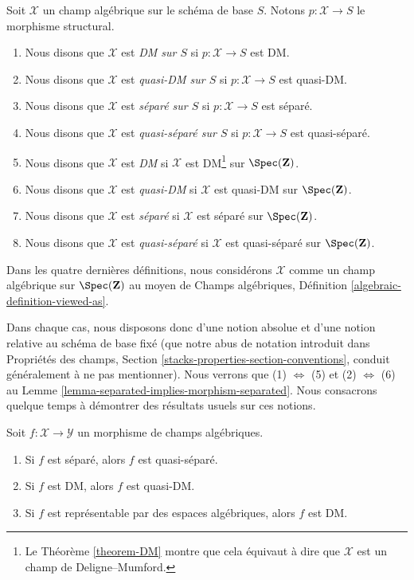 \begin{definition}
\label{definition-absolute-separated}
Soit $\mathcal{X}$ un champ algébrique sur le schéma de base $S$. Notons
$p:\mathcal{X}\to S$ le morphisme structural.
\begin{enumerate}
\item Nous disons que $\mathcal{X}$ est {\it DM sur $S$} si
$p:\mathcal{X}\to S$ est DM.
\item Nous disons que $\mathcal{X}$ est {\it quasi-DM sur $S$} si
$p:\mathcal{X}\to S$ est quasi-DM.
\item Nous disons que $\mathcal{X}$ est {\it séparé sur $S$} si
$p:\mathcal{X}\to S$ est séparé.
\item Nous disons que $\mathcal{X}$ est {\it quasi-séparé sur $S$} si
$p:\mathcal{X}\to S$ est quasi-séparé.
\item Nous disons que $\mathcal{X}$ est {\it DM} si $\mathcal{X}$ est
DM\footnote{Le Théorème \ref{theorem-DM} montre que cela équivaut à dire que
$\mathcal{X}$ est un champ de Deligne--Mumford.} sur $\Spec(\mathbf{Z})$.
\item Nous disons que $\mathcal{X}$ est {\it quasi-DM} si $\mathcal{X}$ est
quasi-DM sur $\Spec(\mathbf{Z})$.
\item Nous disons que $\mathcal{X}$ est {\it séparé} si $\mathcal{X}$ est
séparé sur $\Spec(\mathbf{Z})$.
\item Nous disons que $\mathcal{X}$ est {\it quasi-séparé} si
$\mathcal{X}$ est quasi-séparé sur $\Spec(\mathbf{Z})$.
\end{enumerate}
Dans les quatre dernières définitions, nous considérons $\mathcal{X}$ comme un
champ algébrique sur $\Spec(\mathbf{Z})$ au moyen de Champs algébriques,
Définition \ref{algebraic-definition-viewed-as}.
\end{definition}

\noindent
Dans chaque cas, nous disposons donc d'une notion absolue et d'une notion
relative au schéma de base fixé (que notre abus de notation introduit dans
Propriétés des champs, Section \ref{stacks-properties-section-conventions},
conduit généralement à ne pas mentionner). Nous verrons que
(1) $\Leftrightarrow$ (5) et (2) $\Leftrightarrow$ (6) au Lemme
\ref{lemma-separated-implies-morphism-separated}. Nous consacrons quelque
temps à démontrer des résultats usuels sur ces notions.

\begin{lemma}
\label{lemma-trivial-implications}
Soit $f : \mathcal{X} \to \mathcal{Y}$ un morphisme de champs algébriques.
\begin{enumerate}
\item Si $f$ est séparé, alors $f$ est quasi-séparé.
\item Si $f$ est DM, alors $f$ est quasi-DM.
\item Si $f$ est représentable par des espaces algébriques, alors $f$ est DM.
\end{enumerate}
\end{lemma}


